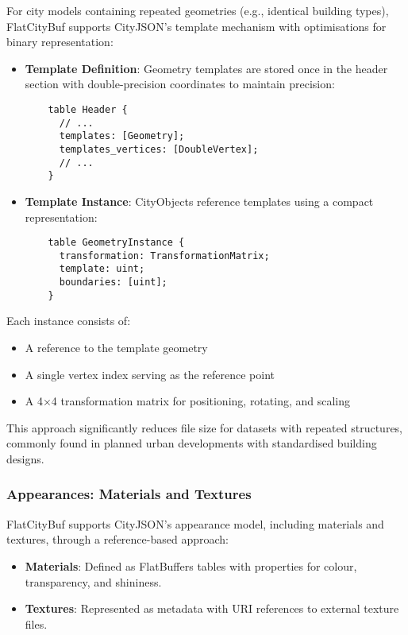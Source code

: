 For city models containing repeated geometries (e.g., identical building types), FlatCityBuf supports CityJSON's template mechanism with optimisations for binary representation:

\begin{itemize}
    \item \textbf{Template Definition}: Geometry templates are stored once in the header section with double-precision coordinates to maintain precision:

    \begin{verbatim}
    table Header {
      // ...
      templates: [Geometry];
      templates_vertices: [DoubleVertex];
      // ...
    }
    \end{verbatim}

    \item \textbf{Template Instance}: CityObjects reference templates using a compact representation:

    \begin{verbatim}
    table GeometryInstance {
      transformation: TransformationMatrix;
      template: uint;
      boundaries: [uint];
    }
    \end{verbatim}
\end{itemize}

Each instance consists of:
\begin{itemize}
    \item A reference to the template geometry
    \item A single vertex index serving as the reference point
    \item A 4×4 transformation matrix for positioning, rotating, and scaling
\end{itemize}

This approach significantly reduces file size for datasets with repeated structures, commonly found in planned urban developments with standardised building designs.

\subsubsection{Appearances: Materials and Textures}
\label{methodology:feature_encoding:appearances}

FlatCityBuf supports CityJSON's appearance model, including materials and textures, through a reference-based approach:

\begin{itemize}
    \item \textbf{Materials}: Defined as FlatBuffers tables with properties for colour, transparency, and shininess.
    \item \textbf{Textures}: Represented as metadata with URI references to external texture files.
\end{itemize}

